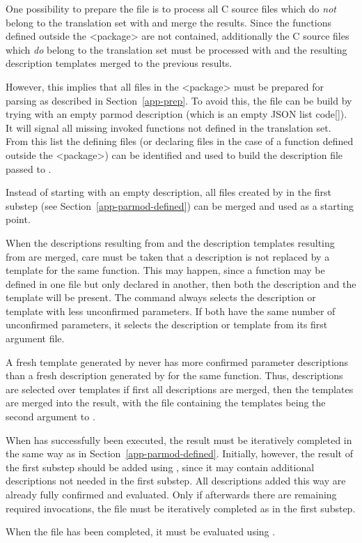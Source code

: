 One possibility to prepare the file is to process all C source files which do \textit{not} belong to the 
translation set with  and merge the results. Since the functions defined outside the <package>
are not contained, additionally the C source files which \textit{do} belong to the translation set must be
processed with  and the resulting description templates merged to the previous results. 

However, this implies that all files in the
<package> must be prepared for parsing as described in Section~\ref{app-prep}. To avoid this, the file can
be build by trying  with an empty parmod description (which is an empty JSON list code{[]}).
It will signal all missing invoked functions not defined in the translation set. From this list the defining 
files (or declaring files in the case of a function defined outside the <package>) can be identified and used 
to build the description file passed to .

Instead of starting with an empty description, all files created by  in the first substep 
(see Section~\ref{app-parmod-defined}) can be merged and used as a starting point.  

When the descriptions resulting from  and the description templates resulting from 
are merged, care must be taken that a description is not replaced by a template for the same function. This may 
happen, since a function may be defined in one  file but only declared in another, then both the description
and the template will be present. The command  always selects the description or template with less 
unconfirmed parameters. If both have the same number of unconfirmed parameters, it selects the description or template from
its first argument file. 

A fresh template generated by  never has more confirmed parameter descriptions than a fresh 
description generated by  for the same function. Thus, descriptions are selected over templates
if first all descriptions are merged, then the templates are merged into the result, with the file containing the
templates being the second argument to .

When  has successfully been executed, the result must be iteratively completed in the same way 
as in Section~\ref{app-parmod-defined}. Initially, however, the result of the first substep should be added 
using , since it may contain additional descriptions not needed in the first substep.
All descriptions added this way are already fully confirmed and evaluated. Only if afterwards there are remaining 
required invocations, the file must be iteratively completed as in the first substep. 

When the file has been completed, it must be evaluated using .
